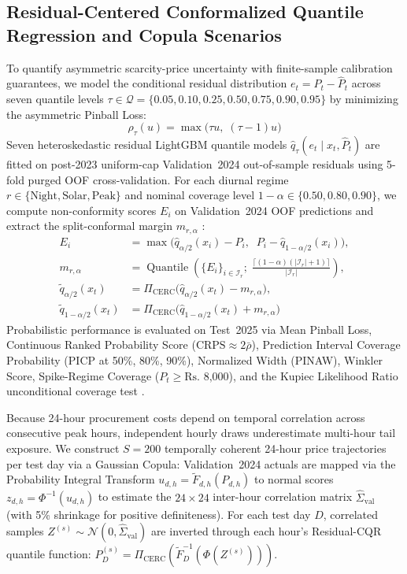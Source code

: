 \documentclass[runningheads,a4paper]{llncs}
\begin{document}
\subsection{Residual-Centered Conformalized Quantile Regression and Copula Scenarios}
To quantify asymmetric scarcity-price uncertainty with finite-sample calibration guarantees, we model the conditional residual distribution $e_t = P_t - \hat{P}_t$ across seven quantile levels $\tau \in \mathcal{Q} = \{0.05, 0.10, 0.25, 0.50, 0.75, 0.90, 0.95\}$ by minimizing the asymmetric Pinball Loss:
\begin{equation}
\rho_\tau(u) = \max\!\big(\tau u, \; (\tau - 1) u\big)
\label{eq:pinball}
\end{equation}
Seven heteroskedastic residual LightGBM quantile models $\hat{q}_\tau(e_t \mid x_t, \hat{P}_t)$ are fitted on post-2023 uniform-cap Validation~2024 out-of-sample residuals using 5-fold purged OOF cross-validation. For each diurnal regime $r \in \{\text{Night}, \text{Solar}, \text{Peak}\}$ and nominal coverage level $1 - \alpha \in \{0.50, 0.80, 0.90\}$, we compute non-conformity scores $E_i$ on Validation~2024 OOF predictions and extract the split-conformal margin $m_{r,\alpha}$ \cite{romano2019conformalized}:
\begin{equation}
\begin{aligned}
E_i &= \max\!\Big(\hat{q}_{\alpha/2}(x_i) - P_i, \;\; P_i - \hat{q}_{1-\alpha/2}(x_i)\Big), \\
m_{r,\alpha} &= \operatorname{Quantile}\!\left(\{E_i\}_{i \in \mathcal{I}_r}; \; \frac{\lceil(1-\alpha)(|\mathcal{I}_r|+1)\rceil}{|\mathcal{I}_r|}\right), \\
\tilde{q}_{\alpha/2}(x_t) &= \Pi_{\text{CERC}}\!\big(\hat{q}_{\alpha/2}(x_t) - m_{r,\alpha}\big), \\
\tilde{q}_{1-\alpha/2}(x_t) &= \Pi_{\text{CERC}}\!\big(\hat{q}_{1-\alpha/2}(x_t) + m_{r,\alpha}\big)
\end{aligned}
\label{eq:cqr_margin}
\end{equation}
Probabilistic performance is evaluated on Test~2025 via Mean Pinball Loss, Continuous Ranked Probability Score ($\text{CRPS} \approx 2\bar{\rho}$), Prediction Interval Coverage Probability (PICP at 50\%, 80\%, 90\%), Normalized Width (PINAW), Winkler Score, Spike-Regime Coverage ($P_t \ge \text{Rs.~8,000}$), and the Kupiec Likelihood Ratio unconditional coverage test \cite{nowotarski2018recent}.

Because 24-hour procurement costs depend on temporal correlation across consecutive peak hours, independent hourly draws underestimate multi-hour tail exposure. We construct $S=200$ temporally coherent 24-hour price trajectories per test day via a Gaussian Copula: Validation~2024 actuals are mapped via the Probability Integral Transform $u_{d,h} = \tilde{F}_{d,h}(P_{d,h})$ to normal scores $z_{d,h} = \Phi^{-1}(u_{d,h})$ to estimate the $24 \times 24$ inter-hour correlation matrix $\hat{\Sigma}_{\text{val}}$ (with 5\% shrinkage for positive definiteness). For each test day $D$, correlated samples $Z^{(s)} \sim \mathcal{N}(0, \hat{\Sigma}_{\text{val}})$ are inverted through each hour's Residual-CQR quantile function: $P_D^{(s)} = \Pi_{\text{CERC}}(\tilde{F}_D^{-1}(\Phi(Z^{(s)})))$.
\end{document}
